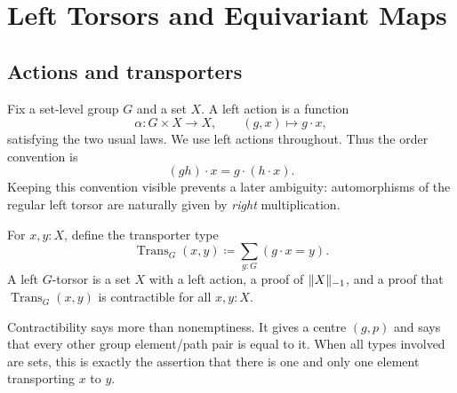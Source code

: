 \section{Left Torsors and Equivariant Maps}
\label{ch:left-torsors}

\subsection{Actions and transporters}
Fix a set-level group $G$ and a set $X$. A left action is a function
\begin{equation}
\alpha:G\times X\longrightarrow X, \qquad (g,x)\longmapsto g\cdot x,
\end{equation}
satisfying the two usual laws. We use left actions throughout. Thus the order convention is
\begin{equation}
(gh)\cdot x=g\cdot(h\cdot x).
\label{eq:left-action-law}
\end{equation}
Keeping this convention visible prevents a later ambiguity: automorphisms of the regular left torsor are naturally given by \emph{right} multiplication.

\begin{definition}
For $x,y:X$, define the transporter type
\begin{equation}
\operatorname{Trans}_G(x,y)\coloneqq\sum_{g:G}(g\cdot x=y).
\end{equation}
A left $G$-torsor is a set $X$ with a left action, a proof of $\lVert X \rVert_{-1}$, and a proof that $\operatorname{Trans}_G(x,y)$ is contractible for all $x,y:X$.
\end{definition}

Contractibility says more than nonemptiness. It gives a centre $(g,p)$ and says that every other group element/path pair is equal to it. When all types involved are sets, this is exactly the assertion that there is one and only one element transporting $x$ to $y$.


